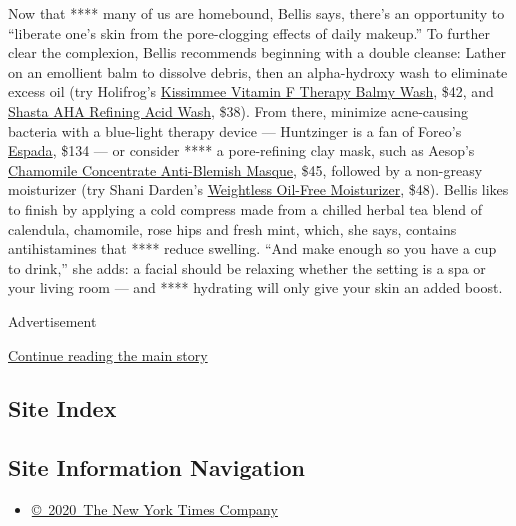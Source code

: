 Now that **** many of us are homebound, Bellis says, there's an
opportunity to ``liberate one's skin from the pore-clogging effects of
daily makeup.'' To further clear the complexion, Bellis recommends
beginning with a double cleanse: Lather on an emollient balm to dissolve
debris, then an alpha-hydroxy wash to eliminate excess oil (try
Holifrog's
\href{https://holifrog.com/collections/holiwashes/products/kissimmee-vitamin-f-therapy-balmy-wash}{Kissimmee
Vitamin F Therapy Balmy Wash}, \$42, and
\href{https://holifrog.com/collections/holiwashes/products/shasta}{Shasta
AHA Refining Acid Wash}, \$38). From there, minimize acne-causing
bacteria with a blue-light therapy device --- Huntzinger is a fan of
Foreo's \href{https://www.foreo.com/espada}{Espada}, \$134 --- or
consider **** a pore-refining clay mask, such as Aesop's
\href{https://www.aesop.com/us/p/skin/treat-masque/chamomile-concentrate-anti-blemish-masque/}{Chamomile
Concentrate Anti-Blemish Masque}, \$45, followed by a non-greasy
moisturizer (try Shani Darden's
\href{https://www.shanidarden.com/collections/shani-darden/products/shani-darden-daily-oil-free-moisturizer}{Weightless
Oil-Free Moisturizer}, \$48). Bellis likes to finish by applying a cold
compress made from a chilled herbal tea blend of calendula, chamomile,
rose hips and fresh mint, which, she says, contains antihistamines that
**** reduce swelling. ``And make enough so you have a cup to drink,''
she adds: a facial should be relaxing whether the setting is a spa or
your living room --- and **** hydrating will only give your skin an
added boost.

Advertisement

\protect\hyperlink{after-bottom}{Continue reading the main story}

\hypertarget{site-index}{%
\subsection{Site Index}\label{site-index}}

\hypertarget{site-information-navigation}{%
\subsection{Site Information
Navigation}\label{site-information-navigation}}

\begin{itemize}
\tightlist
\item
  \href{https://help.nytimes3xbfgragh.onion/hc/en-us/articles/115014792127-Copyright-notice}{©~2020~The
  New York Times Company}
\end{itemize}

